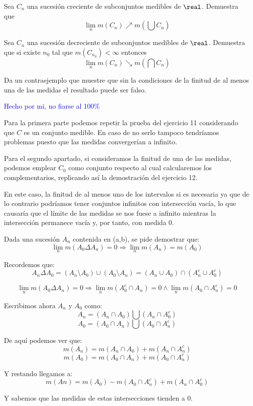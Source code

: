 \begin{problem}[13]
Sea $C_n$ una sucesión creciente de subconjuntos medibles de $\real$. Demuestra que
\[\lim_nm(C_n) \nearrow m(\bigcup C_n)\]

Sea $C_n$ una sucesión decreciente de subconjuntos medibles de $\real$. Demuestra que si existe $n_0$ tal que $m(C_{n_0}) < \infty$ entonces
\[\lim_nm(C_n) \searrow m(\bigcap C_n)\]

Da un contraejemplo que muestre que sin la condiciones de la finitud de al menos una de las medidas el resultado puede ser falso.

\solution

\textcolor{blue}{Hecho por mi, no fiarse al 100\%}

Para la primera parte podemos repetir la prueba del ejercicio 11 considerando que $C$ es un conjunto medible. En caso de no serlo tampoco tendríamos problemas puesto que las medidas convergerían a infinito.

Para el segundo apartado, si consideramos la finitud de una de las medidas, podemos emplear $C_0$ como conjunto respecto al cual calcularemos los complementarios, replicando así la demostración del ejercicio 12.

En este caso, la finitud de al menos uno de los intervalos si es necesaria ya que de lo contrario podríamos tener conjuntos infinitos con intersección vacía, lo que causaría que el límite de las medidas se nos fuese a infinito mientras la intersección permanece vacía y, por tanto, con medida 0.

\end{problem}
\newpage
\begin{problem}[14]
Dada una sucesión $A_n$ contenida en (a,b), se pide demostrar que:
\[\lim_n m(A_0\Delta A_n)=0 \Rightarrow \lim_n m(A_n)=m(A_0) \]

Recordemos que:
\[ A_n \Delta A_0 = (A_n \setminus A_0) \cup (A_0 \setminus A_n) =
(A_n \cup A_0)\cap(A_n^c \cup A_0^c) \]

\solution

\[\lim_n m(A_0\Delta A_n)=0 \Rightarrow \lim_n m(A_0^c \cap A_n)=0 \wedge \lim_n m(A_0\cap A_n^c)=0\]

Escribimos ahora $A_n$ y $A_0$ como:
\[A_n = (A_n \cap A_0) \bigcup (A_n \cap A_0^c)\]
\[A_0 = (A_0 \cap A_n) \bigcup (A_0 \cap A_n^c)\]

De aquí podemos ver que:
\[m(A_n) = m(A_n \cap A_0) + m(A_n \cap A_n^c)\]
\[m(A_0) = m(A_0 \cap A_n) + m(A_0 \cap A_n^c)\]

Y restando llegamos a:
\[m(An) = m(A_0) -m(A_0 \cap A_n^c) + m(A_n \cap A_0^c)\]

Y sabemos que las medidas de estas intersecciones tienden a 0.
\end{problem}

